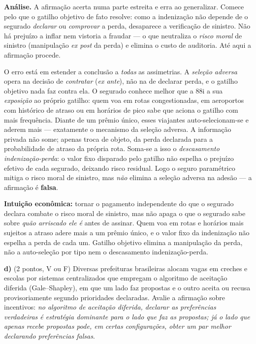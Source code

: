 \begin{solucao}
\textbf{Análise.} A afirmação acerta numa parte estreita e erra ao generalizar. Comece pelo que o gatilho objetivo de fato resolve: como a indenização não depende de o segurado \emph{declarar} ou \emph{comprovar} a perda, desaparece a verificação de sinistro. Não há prejuízo a inflar nem vistoria a fraudar --- o que neutraliza o \emph{risco moral} de sinistro (manipulação \emph{ex post} da perda) e elimina o custo de auditoria. Até aqui a afirmação procede.

O erro está em estender a conclusão a \emph{todas} as assimetrias. A \emph{seleção adversa} opera na decisão de \emph{contratar} (\emph{ex ante}), não na de declarar perda, e o gatilho objetivo nada faz contra ela. O segurado conhece melhor que a 88i a sua \emph{exposição} ao próprio gatilho: quem voa em rotas congestionadas, em aeroportos com histórico de atraso ou em horários de pico sabe que aciona o gatilho com mais frequência. Diante de um prêmio único, esses viajantes auto-selecionam-se e aderem mais --- exatamente o mecanismo da seleção adversa. A informação privada não some; apenas troca de objeto, da perda declarada para a probabilidade de atraso da própria rota. Soma-se a isso o \emph{descasamento indenização-perda}: o valor fixo disparado pelo gatilho não espelha o prejuízo efetivo de cada segurado, deixando risco residual. Logo o seguro paramétrico mitiga o risco moral de sinistro, mas \emph{não} elimina a seleção adversa na adesão --- a afirmação é \textbf{falsa}.

\textbf{Intuição econômica:} tornar o pagamento independente do que o segurado declara combate o risco moral de sinistro, mas não apaga o que o segurado sabe sobre \emph{quão arriscado ele é} antes de assinar. Quem voa em rotas e horários mais sujeitos a atraso adere mais a um prêmio único, e o valor fixo da indenização não espelha a perda de cada um. Gatilho objetivo elimina a manipulação da perda, não a auto-seleção por tipo nem o descasamento indenização-perda.
\end{solucao}

\textbf{d)} (2 pontos, V ou F) Diversas prefeituras brasileiras alocam vagas em creches e escolas por sistemas centralizados que empregam o algoritmo de aceitação diferida (Gale--Shapley), em que um lado faz propostas e o outro aceita ou recusa provisoriamente segundo prioridades declaradas. Avalie a afirmação sobre incentivos: \emph{no algoritmo de aceitação diferida, declarar as preferências verdadeiras é estratégia dominante para o lado que faz as propostas; já o lado que apenas recebe propostas pode, em certas configurações, obter um par melhor declarando preferências falsas}.

